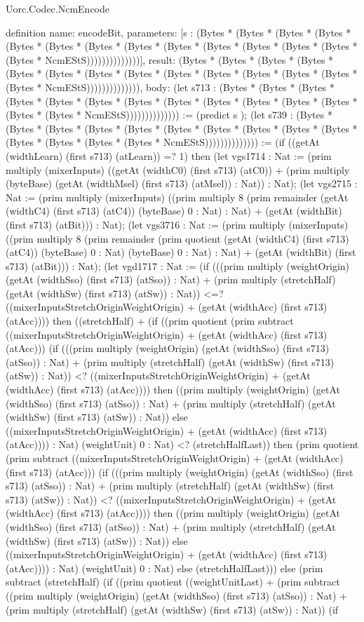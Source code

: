 \begin{lexlean}{Uorc.Codec.NcmEncode}
\begin{semanticmodule}
definition{
  name: encodeBit,
  parameters: [s : (Bytes * (Bytes * (Bytes * (Bytes * (Bytes * (Bytes * (Bytes * (Bytes * (Bytes * (Bytes * (Bytes * (Bytes * (Bytes * (Bytes * NcmEStS))))))))))))))],
  result: (Bytes * (Bytes * (Bytes * (Bytes * (Bytes * (Bytes * (Bytes * (Bytes * (Bytes * (Bytes * (Bytes * (Bytes * (Bytes * (Bytes * NcmEStS)))))))))))))),
  body: (let s713 : (Bytes * (Bytes * (Bytes * (Bytes * (Bytes * (Bytes * (Bytes * (Bytes * (Bytes * (Bytes * (Bytes * (Bytes * (Bytes * (Bytes * NcmEStS)))))))))))))) := (predict s ); (let s739 : (Bytes * (Bytes * (Bytes * (Bytes * (Bytes * (Bytes * (Bytes * (Bytes * (Bytes * (Bytes * (Bytes * (Bytes * (Bytes * (Bytes * NcmEStS)))))))))))))) := (if ((getAt (widthLearn) (first s713) (atLearn)) =? 1) then (let vgs1714 : Nat := (prim multiply (mixerInputs) ((getAt (widthC0) (first s713) (atC0)) + (prim multiply (byteBase) (getAt (widthMsel) (first s713) (atMsel)) : Nat)) : Nat); (let vgs2715 : Nat := (prim multiply (mixerInputs) ((prim multiply 8 (prim remainder (getAt (widthC4) (first s713) (atC4)) (byteBase) 0 : Nat) : Nat) + (getAt (widthBit) (first s713) (atBit))) : Nat); (let vgs3716 : Nat := (prim multiply (mixerInputs) ((prim multiply 8 (prim remainder (prim quotient (getAt (widthC4) (first s713) (atC4)) (byteBase) 0 : Nat) (byteBase) 0 : Nat) : Nat) + (getAt (widthBit) (first s713) (atBit))) : Nat); (let vgd1717 : Nat := (if (((prim multiply (weightOrigin) (getAt (widthSso) (first s713) (atSso)) : Nat) + (prim multiply (stretchHalf) (getAt (widthSw) (first s713) (atSw)) : Nat)) <=? ((mixerInputsStretchOriginWeightOrigin) + (getAt (widthAcc) (first s713) (atAcc)))) then ((stretchHalf) + (if ((prim quotient (prim subtract ((mixerInputsStretchOriginWeightOrigin) + (getAt (widthAcc) (first s713) (atAcc))) (if (((prim multiply (weightOrigin) (getAt (widthSso) (first s713) (atSso)) : Nat) + (prim multiply (stretchHalf) (getAt (widthSw) (first s713) (atSw)) : Nat)) <? ((mixerInputsStretchOriginWeightOrigin) + (getAt (widthAcc) (first s713) (atAcc)))) then ((prim multiply (weightOrigin) (getAt (widthSso) (first s713) (atSso)) : Nat) + (prim multiply (stretchHalf) (getAt (widthSw) (first s713) (atSw)) : Nat)) else ((mixerInputsStretchOriginWeightOrigin) + (getAt (widthAcc) (first s713) (atAcc)))) : Nat) (weightUnit) 0 : Nat) <? (stretchHalfLast)) then (prim quotient (prim subtract ((mixerInputsStretchOriginWeightOrigin) + (getAt (widthAcc) (first s713) (atAcc))) (if (((prim multiply (weightOrigin) (getAt (widthSso) (first s713) (atSso)) : Nat) + (prim multiply (stretchHalf) (getAt (widthSw) (first s713) (atSw)) : Nat)) <? ((mixerInputsStretchOriginWeightOrigin) + (getAt (widthAcc) (first s713) (atAcc)))) then ((prim multiply (weightOrigin) (getAt (widthSso) (first s713) (atSso)) : Nat) + (prim multiply (stretchHalf) (getAt (widthSw) (first s713) (atSw)) : Nat)) else ((mixerInputsStretchOriginWeightOrigin) + (getAt (widthAcc) (first s713) (atAcc)))) : Nat) (weightUnit) 0 : Nat) else (stretchHalfLast))) else (prim subtract (stretchHalf) (if ((prim quotient ((weightUnitLast) + (prim subtract ((prim multiply (weightOrigin) (getAt (widthSso) (first s713) (atSso)) : Nat) + (prim multiply (stretchHalf) (getAt (widthSw) (first s713) (atSw)) : Nat)) (if }
\end{semanticmodule}
\end{lexlean}
